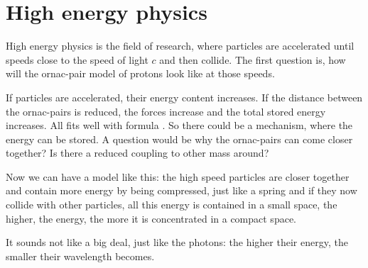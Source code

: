 \chapter{High energy physics}

High energy physics is the field of research, where particles are accelerated until speeds close to the speed of light $c$ and then collide. The first question is, how will the ornac-pair model of protons look like at those speeds. 

If particles are accelerated, their energy content increases. If the distance between the ornac-pairs is reduced, the forces increase and the total stored energy increases. All fits well with formula . So there could be a mechanism, where the energy can be stored. A question would be why the ornac-pairs can come closer together? Is there a reduced coupling to other mass around?

Now we can have a model like this: the high speed particles are closer together and contain more energy by being compressed, just like a spring and if they now collide with other particles, all this energy is contained in a small space, the higher, the energy, the more it is concentrated in a compact space.

It sounds not like a big deal, just like the photons: the higher their energy, the smaller their wavelength becomes.



